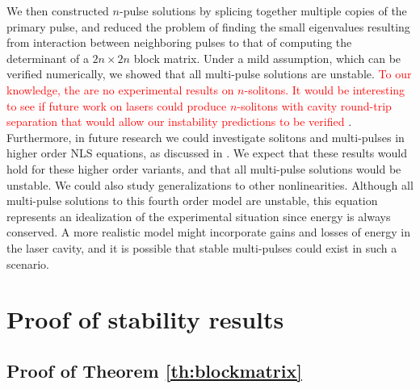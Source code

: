 \documentclass[12pt]{elsarticle}
\newcommand{\revised}[1]{ \textcolor{red}{#1} }
\begin{document}
We then constructed $n$-pulse solutions by splicing together multiple copies of the primary pulse, and reduced the problem of finding the small eigenvalues resulting from interaction between neighboring pulses to that of computing the determinant of a $2n\times2n$ block matrix. Under a mild assumption, which can be verified numerically, we showed that all multi-pulse solutions are unstable. \revised{To our knowledge, the are no experimental results on $n$-solitons. It would be interesting to see if future work on lasers \cite{Blanco_laser} could produce $n$-solitons with cavity round-trip separation that would allow our instability predictions to be verified}. Furthermore, in future research we could investigate solitons and multi-pulses in higher order NLS equations, as discussed in \cite{Runge2020}. We expect that these results would hold for these higher order variants, and that all multi-pulse solutions would be unstable. We could also study generalizations to other nonlinearities. Although all multi-pulse solutions to this fourth order model are unstable, this equation represents an idealization of the experimental situation since energy is always conserved. A more realistic model might incorporate gains and losses of energy in the laser cavity, and it is possible that stable multi-pulses could exist in such a scenario.

\section{Proof of stability results}\label{sec:proofs}

\subsection{Proof of Theorem \ref{th:blockmatrix}}\label{sec:blockmatrixproof}
\end{document}

